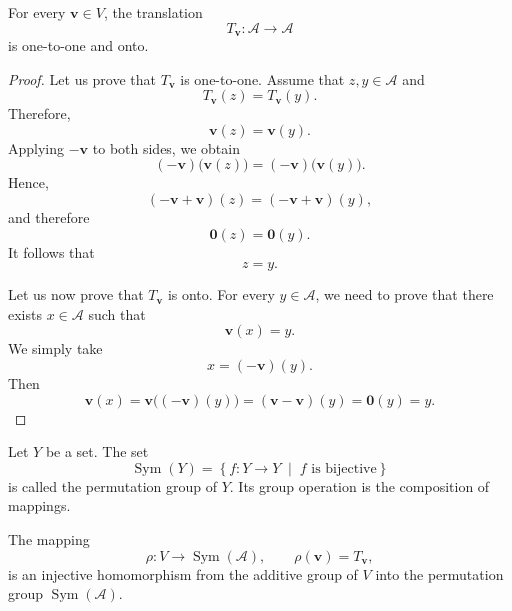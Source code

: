 \documentclass[12pt]{article}
\begin{document}
\begin{proposition}
For every \(\mathbf{v}\in V\), the translation
\[
T_{\mathbf{v}}\colon \mathcal A\longrightarrow \mathcal A
\]
is one-to-one and onto.
\end{proposition}

\begin{proof}
Let us prove that \(T_{\mathbf{v}}\) is one-to-one. Assume that
\(z,y\in \mathcal A\) and
\[
T_{\mathbf{v}}(z)=T_{\mathbf{v}}(y).
\]
Therefore,
\[
\mathbf{v}(z)=\mathbf{v}(y).
\]
Applying \(-\mathbf{v}\) to both sides, we obtain
\[
(-\mathbf{v})\bigl(\mathbf{v}(z)\bigr)
=
(-\mathbf{v})\bigl(\mathbf{v}(y)\bigr).
\]
Hence,
\[
(-\mathbf{v}+\mathbf{v})(z)
=
(-\mathbf{v}+\mathbf{v})(y),
\]
and therefore
\[
\mathbf{0}(z)=\mathbf{0}(y).
\]
It follows that
\[
z=y.
\]

Let us now prove that \(T_{\mathbf{v}}\) is onto. For every \(y\in \mathcal A\), we
need to prove that there exists \(x\in \mathcal A\) such that
\[
\mathbf{v}(x)=y.
\]
We simply take
\[
x=(-\mathbf{v})(y).
\]
Then
\[
\mathbf{v}(x)
=
\mathbf{v}\bigl((-\mathbf{v})(y)\bigr)
=
(\mathbf{v}-\mathbf{v})(y)
=
\mathbf{0}(y)
=
y.
\]
\end{proof}

\begin{definition}
Let \(Y\) be a set. The set
\[
\operatorname{Sym}(Y)
=
\left\{
f\colon Y\longrightarrow Y
\;\middle|\;
f \text{ is bijective}
\right\}
\]
is called the permutation group of \(Y\). Its group operation is the
composition of mappings.
\end{definition}

\begin{proposition}
The mapping
\[
\rho\colon V\longrightarrow\operatorname{Sym}(\mathcal A),
\qquad
\rho(\mathbf{v})=T_{\mathbf{v}},
\]
is an injective homomorphism from the additive group of \(V\) into the
permutation group \(\operatorname{Sym}(\mathcal A)\).
\end{proposition}
\end{document}
